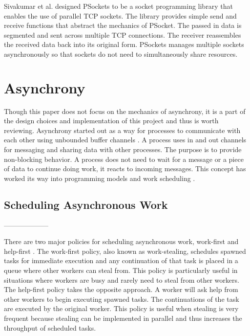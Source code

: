 Sivakumar et al. designed PSockets \cite{Sivakumar2000psockets} to be a socket programming library that enables the use of parallel TCP sockets. The library provides simple send and receive functions that abstract the mechanics of PSocket. The passed in data is segmented and sent across multiple TCP connections. The receiver reassembles the received data back into its original form. PSockets manages multiple sockets asynchronously so that sockets do not need to simultaneously share resources.

\section{Asynchrony}

Though this paper does not focus on the mechanics of asynchrony, it is a part of the design choices and implementation of this project and thus is worth reviewing. Asynchrony started out as a way for processes to communicate with each other using unbounded buffer channels \cite{Josephs1989}. A process uses in and out channels for messaging and sharing data with other processes. The purpose is to provide non-blocking behavior. A process does not need to wait for a message or a piece of data to continue doing work, it reacts to incoming messages. This concept has worked its way into programming models and work scheduling \cite{Guo2009}\cite{Leijen2009}\cite{syme2011f}\cite{sutcliffe1988jackson}\cite{Cameron1986}\cite{Frigo1998}.

\subsection{Scheduling Asynchronous Work}



--------------------

There are two major policies for scheduling asynchronous work, work-first and help-first \cite{Guo2009}. The work-first policy, also known as work-stealing, schedules spawned tasks for immediate execution and any continuation of that task is placed in a queue where other workers can steal from. This policy is particularly useful in situations where workers are busy and rarely need to steal from other workers. The help-first policy takes the opposite approach. A worker will ask help from other workers to begin executing spawned tasks. The continuations of the task are executed by the original worker. This policy is useful when stealing is very frequent because stealing can be implemented in parallel and thus increases the throughput of scheduled tasks.

